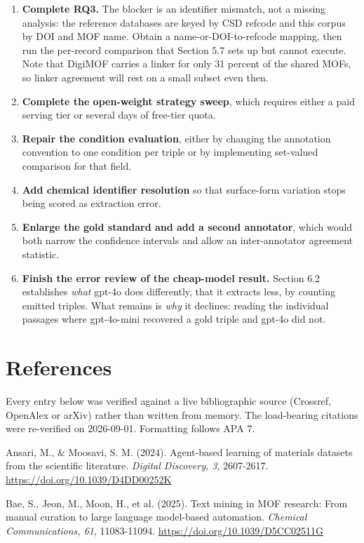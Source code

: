 \documentclass[11pt,a4paper,oneside]{report}
\begin{document}
\begin{enumerate}
\item \textbf{Complete RQ3.} The blocker is an identifier mismatch, not a missing analysis: the reference databases are keyed by CSD refcode and this corpus by DOI and MOF name. Obtain a name-or-DOI-to-refcode mapping, then run the per-record comparison that Section 5.7 sets up but cannot execute. Note that DigiMOF carries a linker for only 31 percent of the shared MOFs, so linker agreement will rest on a small subset even then.
\item \textbf{Complete the open-weight strategy sweep}, which requires either a paid serving tier or several days of free-tier quota.
\item \textbf{Repair the condition evaluation}, either by changing the annotation convention to one condition per triple or by implementing set-valued comparison for that field.
\item \textbf{Add chemical identifier resolution} so that surface-form variation stops being scored as extraction error.
\item \textbf{Enlarge the gold standard and add a second annotator}, which would both narrow the confidence intervals and allow an inter-annotator agreement statistic.
\item \textbf{Finish the error review of the cheap-model result.} Section 6.2 establishes \emph{what} gpt-4o does differently, that it extracts less, by counting emitted triples. What remains is \emph{why} it declines: reading the individual passages where gpt-4o-mini recovered a gold triple and gpt-4o did not.
\end{enumerate}


\chapter{References}


Every entry below was verified against a live bibliographic source (Crossref, OpenAlex or arXiv) rather than written from memory. The load-bearing citations were re-verified on 2026-09-01. Formatting follows APA 7.

Ansari, M., \& Moosavi, S. M. (2024). Agent-based learning of materials datasets from the scientific literature. \emph{Digital Discovery, 3}, 2607-2617. \href{https://doi.org/10.1039/D4DD00252K}{https://doi.org/10.1039/D4DD00252K}

Bae, S., Jeon, M., Moon, H., et al. (2025). Text mining in MOF research: From manual curation to large language model-based automation. \emph{Chemical Communications, 61}, 11083-11094. \href{https://doi.org/10.1039/D5CC02511G}{https://doi.org/10.1039/D5CC02511G}
\end{document}

